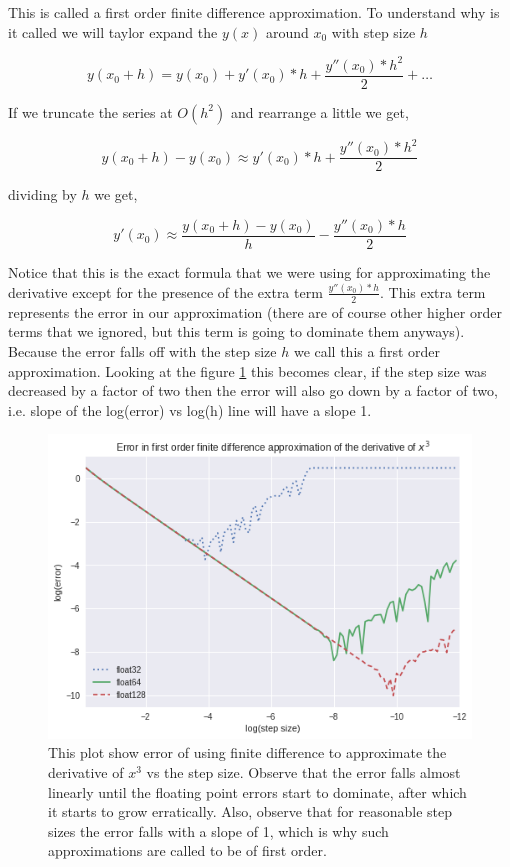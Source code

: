 This is called a  first order finite difference approximation. To understand why is it called we will taylor expand the $y(x)$ around $x_0$ with step size $h$

\begin{equation}
    y(x_0 + h) = y(x_0) + y'(x_0)*h +\frac{y''(x_0)*h^2}{2} + \dots
\end{equation}

If we truncate the series at $O(h^2)$ and rearrange a little we get,

\begin{equation}
    y(x_0 + h) - y(x_0) \approx y'(x_0)*h +\frac{y''(x_0)*h^2}{2}
\end{equation}

dividing by $h$ we get,

\begin{equation}
    y'(x_0)  \approx \frac{y(x_0 + h) - y(x_0)}{h} - \frac{y''(x_0)*h}{2}
    \label{eq:1d_1o_error}
\end{equation}

Notice that this is the exact formula that we were using for approximating the derivative except for the presence of the extra term $\frac{y''(x_0)*h}{2}$. This extra term represents the error in our approximation (there are of course other higher order terms that we ignored, but this term is going to dominate them anyways). Because the error falls off with the step size $h$ we call this a first order approximation. Looking at the figure \ref{fig:x^3_error_order1} this becomes clear, if the step size was decreased by a factor of two then the error will also go down by a factor of two, i.e. slope of the log(error) vs log(h) line will have a slope 1.

\begin{figure}[hbt!]
    \centering
    \includegraphics[width=\textwidth]{images/x^3_error_order1.png}
    \caption{This plot show error of using finite difference to approximate the derivative of $x^3$ vs the step size. Observe that the error falls almost linearly until the floating point errors start to dominate, after which it starts to grow erratically. Also, observe that for reasonable step sizes the error falls with a slope of 1, which is why such approximations are called to be of first order. }\label{fig:x^3_error_order1}
\end{figure}

